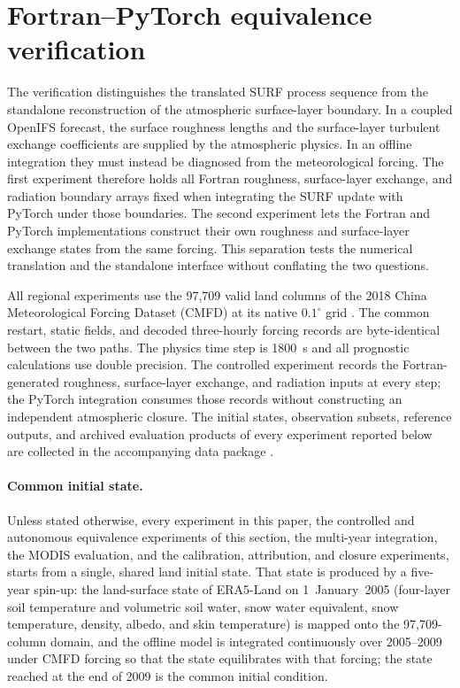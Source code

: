 \section{Fortran--PyTorch equivalence verification}
\label{sec:fortran-torch-equivalence}

The verification distinguishes the translated SURF process sequence from the
standalone reconstruction of the atmospheric surface-layer boundary. In a
coupled OpenIFS forecast, the surface roughness lengths and the
surface-layer turbulent exchange coefficients are supplied by the
atmospheric physics. In an offline integration they must instead be
diagnosed from the meteorological forcing. The first experiment therefore
holds all Fortran roughness, surface-layer exchange, and radiation boundary
arrays fixed when integrating the SURF update with PyTorch under those boundaries. The second
experiment lets the Fortran and PyTorch implementations construct their own
roughness and surface-layer exchange states from the same forcing. This
separation tests the numerical translation and the standalone interface
without conflating the two questions.

All regional experiments use the 97,709 valid land columns of the 2018 China
Meteorological Forcing Dataset (CMFD) at its native $0.1^\circ$ grid
\citep{He2020CMFD}. The common restart, static fields, and decoded
three-hourly forcing records are byte-identical between the two paths. The
physics time step is 1800~s and all prognostic calculations use double
precision. The controlled experiment records the Fortran-generated
roughness, surface-layer exchange, and radiation inputs at every step; the
PyTorch integration consumes those records without constructing an independent
atmospheric closure. The initial states, observation subsets, reference
outputs, and archived evaluation products of every experiment reported below
are collected in the accompanying data package \citep{Yang2026SurfData}.

\paragraph{Common initial state.} Unless stated otherwise, every experiment
in this paper, the controlled and autonomous equivalence experiments of
this section, the multi-year integration, the MODIS evaluation, and the
calibration, attribution, and closure experiments, starts from a single,
shared land initial state. That state is produced by a five-year spin-up:
the land-surface state of ERA5-Land on 1~January~2005 (four-layer soil
temperature and volumetric soil water, snow water equivalent, snow
temperature, density, albedo, and skin temperature) is mapped onto the
97,709-column domain, and the offline model is integrated continuously over
2005--2009 under CMFD forcing so that the state equilibrates with that
forcing; the state reached at the end of 2009 is the common initial
condition.

